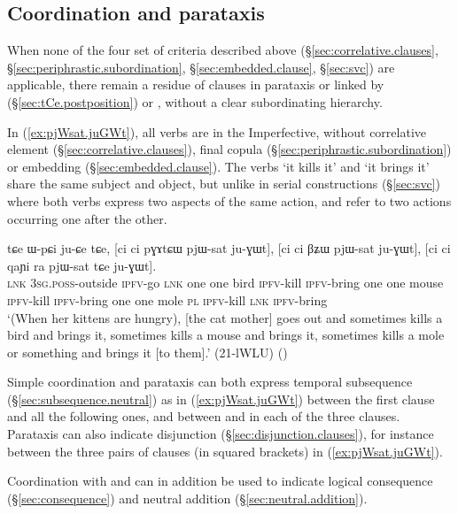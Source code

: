 \subsection{Coordination and parataxis} \label{sec:coordination}
When none of the four set of criteria described above (§\ref{sec:correlative.clauses}, §\ref{sec:periphrastic.subordination}, §\ref{sec:embedded.clause}, §\ref{sec:svc}) are applicable, there remain a residue of clauses in parataxis or linked by  (§\ref{sec:tCe.postposition}) or , without a clear subordinating hierarchy. 

In (\ref{ex:pjWsat.juGWt}), all verbs are in the Imperfective, without correlative element (§\ref{sec:correlative.clauses}), final copula (§\ref{sec:periphrastic.subordination}) or embedding (§\ref{sec:embedded.clause}). The verbs  `it kills it' and  `it brings it' share the same subject and object, but unlike in serial constructions (§\ref{sec:svc}) where both verbs express two aspects of the same action,  and  refer to two actions occurring one after the other.


\begin{exe}
\ex \label{ex:pjWsat.juGWt}
\gll tɕe ɯ-pɕi ju-ɕe tɕe, [ci ci pɣɤtɕɯ pjɯ-sat ju-ɣɯt], [ci ci βʑɯ pjɯ-sat ju-ɣɯt], [ci ci qaɲi ra pjɯ-sat tɕe ju-ɣɯt]. \\
\textsc{lnk} \textsc{3sg}.\textsc{poss}-outside \textsc{ipfv}-go \textsc{lnk} one one bird \textsc{ipfv}-kill \textsc{ipfv}-bring one one mouse \textsc{ipfv}-kill \textsc{ipfv}-bring one one mole \textsc{pl} \textsc{ipfv}-kill \textsc{lnk} \textsc{ipfv}-bring \\
\glt `(When her kittens are hungry), [the cat mother] goes out and sometimes kills a bird and brings it, sometimes kills a mouse and brings it, sometimes kills a mole or something and brings it [to them].' (21-lWLU)
()
\end{exe}

Simple coordination and parataxis can both express temporal subsequence (§\ref{sec:subsequence.neutral}) as in (\ref{ex:pjWsat.juGWt}) between the first clause and all the following ones, and between  and  in each of the three clauses. Parataxis can also indicate disjunction (§\ref{sec:disjunction.clauses}), for instance between the three pairs of clauses (in squared brackets) in (\ref{ex:pjWsat.juGWt}). 

Coordination with  and  can in addition be used to indicate logical consequence (§\ref{sec:consequence}) and neutral addition (§\ref{sec:neutral.addition}).

